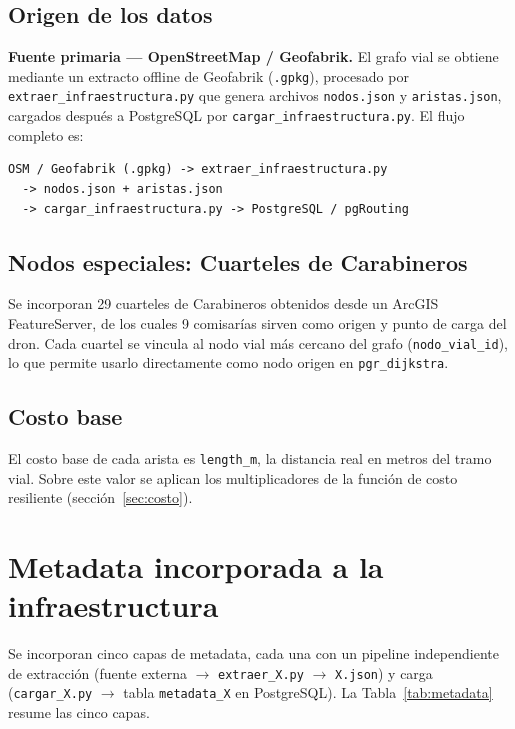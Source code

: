 \documentclass[conference]{IEEEtran}
\begin{document}
\subsection{Origen de los datos}

\textbf{Fuente primaria --- OpenStreetMap / Geofabrik.} El grafo vial se obtiene mediante un extracto offline de Geofabrik (\texttt{.gpkg}), procesado por \texttt{extraer\_infraestructura.py} que genera archivos \texttt{nodos.json} y \texttt{aristas.json}, cargados después a PostgreSQL por \texttt{cargar\_infraestructura.py}. El flujo completo es:

\begin{lstlisting}
OSM / Geofabrik (.gpkg) -> extraer_infraestructura.py
  -> nodos.json + aristas.json
  -> cargar_infraestructura.py -> PostgreSQL / pgRouting
\end{lstlisting}

\subsection{Nodos especiales: Cuarteles de Carabineros}

Se incorporan 29 cuarteles de Carabineros obtenidos desde un ArcGIS FeatureServer, de los cuales 9 comisarías sirven como origen y punto de carga del dron. Cada cuartel se vincula al nodo vial más cercano del grafo (\texttt{nodo\_vial\_id}), lo que permite usarlo directamente como nodo origen en \texttt{pgr\_dijkstra}.

\subsection{Costo base}

El costo base de cada arista es \texttt{length\_m}, la distancia real en metros del tramo vial. Sobre este valor se aplican los multiplicadores de la función de costo resiliente (sección~\ref{sec:costo}).

\section{Metadata incorporada a la infraestructura}
\label{sec:metadata}

Se incorporan cinco capas de metadata, cada una con un pipeline independiente de extracción (fuente externa $\to$ \texttt{extraer\_X.py} $\to$ \texttt{X.json}) y carga (\texttt{cargar\_X.py} $\to$ tabla \texttt{metadata\_X} en PostgreSQL). La Tabla~\ref{tab:metadata} resume las cinco capas.
\end{document}
